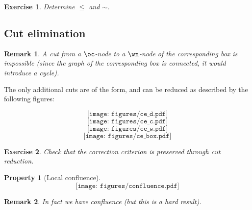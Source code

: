 \documentclass[a4paper,10pt]{article}
\newtheorem{prop}{Property}
\newtheorem{exo}{Exercise}
\newtheorem{rmk}{Remark}
\begin{document}
	\begin{exo}
		Determine $\le$ and $\sim$.
	\end{exo}
	
	\subsection{Cut elimination}
	\begin{rmk}
		A cut from a $\oc $-node to a $\wn $-node of the corresponding box is impossible (since the graph of the corresponding box is connected, it would introduce a cycle).
		\end{rmk}		
	The only additional cuts are of the form, and can be reduced as described by the following figures:%
	
		$$\texttt{[image: figures/ce\_d.pdf]}$$
		$$\texttt{[image: figures/ce\_c.pdf]}$$
		$$\texttt{[image: figures/ce\_w.pdf]}$$
		$$\texttt{[image: figures/ce\_box.pdf]}$$
	
	\begin{exo}
		Check that the correction criterion is preserved through cut reduction.
	\end{exo}	
	
	\begin{prop}[Local confluence]
	$$\texttt{[image: figures/confluence.pdf]}$$
	\end{prop}	
		
	\begin{rmk}
		In fact we have confluence (but this is a hard result).
	\end{rmk}
		
\end{document}
